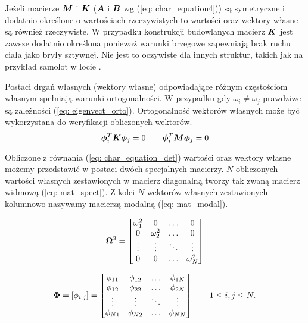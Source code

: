 Jeżeli macierze $\bm{M}$ i $\bm{K}$ ($\bm{A}$ i $\bm{B}$ wg (\ref{eq: char_equation4})) są symetryczne i dodatnio określone o wartościach rzeczywistych to wartości oraz wektory własne są również rzeczywiste. W przypadku konstrukcji budowlanych macierz $\bm{K}$ jest zawsze dodatnio określona ponieważ warunki brzegowe zapewniają brak ruchu ciała jako bryły sztywnej. Nie jest to oczywiste dla innych struktur, takich jak na przykład samolot w locie \parencite{Chopra2012a}.


Postaci drgań własnych (wektory własne) odpowiadające różnym częstościom własnym spełniają warunki ortogonalności. W przypadku gdy $\omega_i \neq \omega_j$ prawdziwe są zależności (\ref{eq: eigenvect_orto}). Ortogonalność wektorów własnych może być wykorzystana do weryfikacji obliczonych wektorów. 
\begin{equation} \label{eq: eigenvect_orto}
\bm{\phi}_i^{T}\bm{K\phi}_j = 0 \qquad \bm{\phi}_i^{T}\bm{M\phi}_j = 0
\end{equation}

Obliczone z równania (\ref{eq: char_equation_det}) wartości oraz wektory własne możemy przedstawić w postaci dwóch specjalnych macierzy. $N$ obliczonych wartości własnych zestawionych w macierz diagonalną tworzy tak zwaną macierz widmową (\ref{eq: mat_spect}). Z kolei $N$ wektorów własnych zestawionych kolumnowo nazywamy macierzą modalną (\ref{eq: mat_modal}).

\begin{equation}  \label{eq: mat_spect}
\bm{\Omega}^2 =  
\begin{bmatrix} 
	\omega_{1}^2 & 0 			& \dots  & 0      \\ 
	0 		     & \omega_{2}^2 & \dots  & 0      \\
	\vdots       & \vdots       & \ddots & \vdots \\
	0 			 & 0 		    & \dots  & \omega_{N}^2 


\end{bmatrix}
\end{equation}

\begin{equation} \label{eq: mat_modal}
	\bm{\Phi} = [\phi_{i,j}]= 
	\begin{bmatrix} 
		\phi_{11} & \phi_{12} & \dots & \phi_{1N} \\ 
		\phi_{12} & \phi_{22} & \dots & \phi_{2N} \\
		\vdots    & \vdots    & \ddots & \vdots \\
		\phi_{N1} & \phi_{N2} & \dots & \phi_{NN} 
	
	
	\end{bmatrix}
	\qquad
	1\leq i,j \leq N.
\end{equation}

